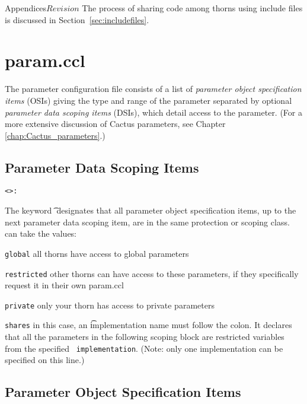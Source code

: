 \begin{cactuspart}{Appendices}{}{$Revision$}
The process of sharing code among thorns using include files is
discussed in Section~\ref{sec:includefiles}.

\section{param.ccl}
\label{sec:Appendix.param}

The parameter configuration file consists of a list of
\textit{parameter object specification items} (OSIs) giving the type and
range of the parameter separated by optional
\textit{parameter data scoping items} (DSIs), which detail access to the
parameter.  (For a more extensive discussion of Cactus parameters, see Chapter
\ref{chap:Cactus_parameters}.)

\subsection{Parameter Data Scoping Items}

\begin{alltt}
<>:
\end{alltt}

The keyword {\t {}} designates that all parameter object specification
items, up to the next parameter data scoping item, are in the same
protection or scoping class. {\tt {}} can take the values:
\begin{Lentry}
\item[{\tt global}] all thorns have access to global parameters
\item[{\tt restricted}] other thorns can have access to these
                           parameters, if they specifically request
                           it in their own param.ccl
\item[{\tt private}] only your thorn has access to private parameters
\item[{\tt shares}] in this case, an {\t implementation} name must
follow the colon. It declares that all the parameters in the following
scoping block are restricted variables from the specified {\tt
implementation}.  (Note: only one implementation can be specified
on this line.)
\end{Lentry}


\subsection{Parameter Object Specification Items}
\label{subsec:Appendix.param.specification_items}


\end{cactuspart}
